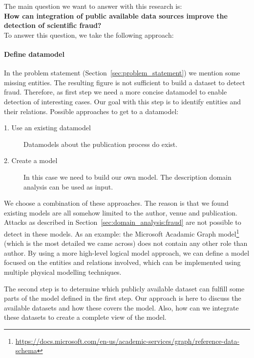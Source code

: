 \documentclass{ou-report}
\begin{document}

The main question we want to answer with this research is: \\

\textbf{How can integration of public available data sources improve the detection of scientific fraud?} \\

To answer this question, we take the following approach:

\paragraph{Define datamodel}
In the problem statement (Section~\ref{sec:problem_statement}) we mention some 
missing entities. The resulting figure is not sufficient to build a dataset 
to detect fraud. Therefore, as first step we need a more concise datamodel to 
enable detection of interesting cases. Our goal with this step is to identify
entities and their relations.
Possible approaches to get to a datamodel:
\begin{description}
    \item[1. Use an existing datamodel] Datamodels about the publication process
    do exist.
    \item[2. Create a model] In this case we need to build our own model. The 
    description domain analysis can be used as input.
\end{description}

We choose a combination of these approaches. The reason is that we found 
existing models are all somehow limited to 
the author, venue and publication. Attacks as described in 
Section~\ref{sec:domain_analysis:fraud} are not possible to detect in 
these models. As an example: the Microsoft Acadamic Graph 
model\footnote{\url{https://docs.microsoft.com/en-us/academic-services/graph/reference-data-schema}} 
(which is the most detailed we came across) does not contain any other role 
than author.
By using a more high-level logical model approach, we can define a model 
focused on the entities and relations involved, which can be implemented 
using multiple physical modelling techniques. 

The second step is to determine which publicly available dataset can fulfill 
some parts of the model defined in the first step. Our approach is here to 
discuss the available datasets and how these covers the model. Also, how 
can we integrate these datasets to create a complete view of the model.
\end{document}
